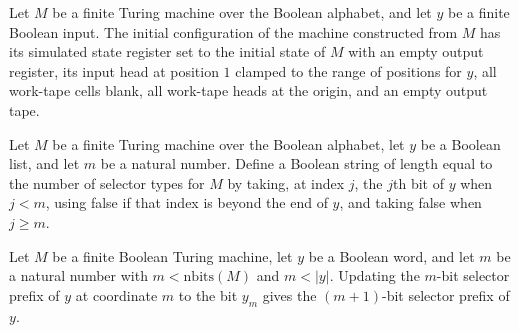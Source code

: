 \begin{theorem}
\label{Complexity.Meyer.init_eq}
\leanok
{}
Let $M$ be a finite Turing machine over the Boolean alphabet, and let $y$ be a finite
Boolean input. The initial configuration of the machine constructed from $M$ has its
simulated state register set to the initial state of $M$ with an empty output register,
its input head at position $1$ clamped to the range of positions for $y$, all work-tape
cells blank, all work-tape heads at the origin, and an empty output tape.
\end{theorem}

\begin{definition}
\label{Complexity.Meyer.selPart}
\leanok
{}
Let $M$ be a finite Turing machine over the Boolean alphabet, let $y$ be a Boolean list,
and let $m$ be a natural number. Define a Boolean string of length equal to the number
of selector types for $M$ by taking, at index $j$, the $j$th bit of $y$ when $j<m$,
using false if that index is beyond the end of $y$, and taking false when $j\ge m$.
\end{definition}

\begin{theorem}
\label{Complexity.Meyer.selPart_succ}
\leanok
{}
Let $M$ be a finite Boolean Turing machine, let $y$ be a Boolean word, and let $m$ be a
natural number with $m<\mathrm{nbits}(M)$ and $m<|y|$. Updating the $m$-bit selector
prefix of $y$ at coordinate $m$ to the bit $y_m$ gives the $(m+1)$-bit selector prefix
of $y$.
\end{theorem}

